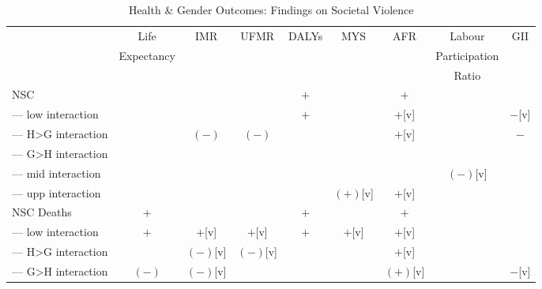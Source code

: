 \begin{landscape}
\begin{table}[!htbp]
\centering
\caption{Health \& Gender Outcomes: Findings on Societal Violence}
\label{table_hg_societal}
\begin{tabular}{lcccccccc}
\toprule
                    & Life       & IMR            & UFMR           & DALYs             & MYS      & AFR            & Labour        & GII \\
                    & Expectancy &                &                &                   &          &                & Participation & \\
                    &            &                &                &                   &          &                & Ratio         & \\
\midrule
NSC                 &            &                &                & $+$               &          & $+$            &               & \\
--- low interaction &            &                &                & $+$               &          & $+$[v]         &               & $-$[v] \\
--- H>G interaction &            & $(-)$          & $(-)$          &                   &          & $+$[v]         &               & $-$ \\
--- G>H interaction &            &                &                &                   &          &                &               & \\
--- mid interaction &            &                &                &                   &          &                & $(-)$[v]      & \\
--- upp interaction &            &                &                &                   & $(+)$[v] & $+$[v]         &               & \\
NSC Deaths          & $+$        &                &                & $+$               &          & $+$            &               & \\
--- low interaction & $+$        & $+$[v]         & $+$[v]         & $+$               & $+$[v]   & $+$[v]         &               & \\
--- H>G interaction &            & $(-)$[v]       & $(-)$[v]       &                   &          & $+$[v]         &               & \\
--- G>H interaction & $(-)$      & $(-)$[v]       &                &                   &          & $(+)$[v]       &               & $-$[v] \\

\end{tabular}
\end{table}
\end{landscape}

